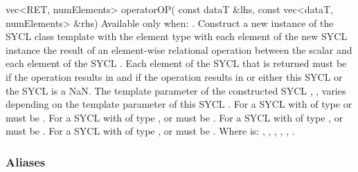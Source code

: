   \addRowThreeL
    { vec<RET, numElements> operatorOP( }
    { const dataT \&lhs, }
    { const vec<dataT, numElements> \&rhs) }
    {
      Available only when: .
      \newline
      Construct a new instance of the SYCL  class template with
      the element type  with each element of the new SYCL
       instance the result of an element-wise 
      relational operation between the  scalar and each element
      of the  SYCL . Each element of the SYCL
       that is returned must be  if the operation
      results in  and  if the operation results
      in  or either this SYCL  or the
       SYCL  is a NaN.
      \newline \newline
      The  template parameter of the constructed SYCL
      , , varies depending on the  template parameter of this SYCL . For a SYCL
       with  of type  or
        must be . For a
      SYCL  with  of type ,  or  
      must be . For a SYCL  with
       of type ,  or
        must be . For a
      SYCL  with  of type ,  or  
      must be .
      \newline \newline
      Where  is: \codeinline{==}, \codeinline{!=}, \codeinline{<}, \codeinline{>}, \codeinline{<=}, \codeinline{>=}.
    }
\completeTable

\subsubsection{Aliases}

